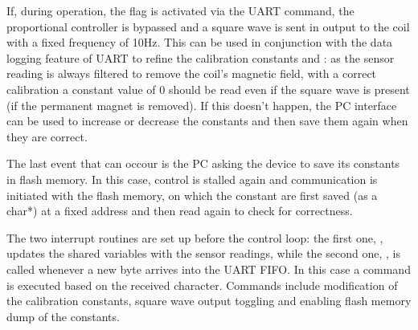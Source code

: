 If, during operation, the  flag is activated via the  UART command, the proportional controller is bypassed and a square wave is sent in output to the coil with a fixed frequency of 10Hz. This can be used in conjunction with the data logging feature of UART to refine the calibration constants  and : as the sensor reading is always filtered to remove the coil's magnetic field, with a correct calibration a constant value of 0 should be read even if the square wave is present (if the permanent magnet is removed). If this doesn't happen, the PC interface can be used to increase or decrease the constants and then save them again when they are correct.

The last event that can occour is the PC asking the device to save its constants in flash memory. In this case, control is stalled again and communication is initiated with the flash memory, on which the constant are first saved (as a char*) at a fixed address and then read again to check for correctness.

The two interrupt routines are set up before the control loop: the first one, , updates the shared variables with the sensor readings, while the second one, , is called whenever a new byte arrives into the UART FIFO. In this case a command is executed based on the received character. Commands include modification of the calibration constants, square wave output toggling and enabling flash memory dump of the constants.
